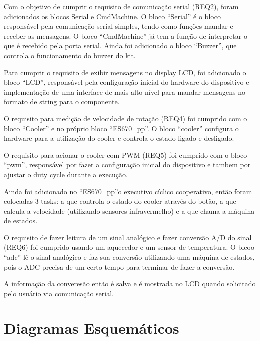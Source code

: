 \documentclass{article}
\begin{document}
Com o objetivo de cumprir o requisito de comunicação serial (REQ2), foram adicionados os blocos Serial e CmdMachine. O bloco ``Serial'' é o bloco responsável pela comunicação serial simples, tendo como funções mandar e receber as mensagens. O bloco ``CmdMachine'' já tem a função de interpretar o que é recebido pela porta serial. Ainda foi adicionado o bloco ``Buzzer'', que controla o funcionamento do buzzer do kit.

Para cumprir o requisito de exibir mensagens no display LCD, foi adicionado o bloco ``LCD'', responsável pela configuração inicial do hardware do dispositivo e implementação de uma interface de mais alto nível para mandar mensagens no formato de string para o componente.

O requisito para medição de velocidade de rotação (REQ4) foi cumprido com o bloco ``Cooler'' e no próprio bloco ``ES670\_pp''. O bloco ``cooler'' configura o hardware para a utilização do cooler e controla o estado ligado e desligado.

O requisito para acionar o cooler com PWM (REQ5) foi cumprido com o bloco ``pwm'', responsável por fazer a configuração inicial do dispositivo e tambem por ajustar o duty cycle durante a execução.

Ainda foi adicionado no ``ES670\_pp''o executivo cíclico cooperativo, então foram colocadas 3 tasks: a que controla o estado do cooler através do botão, a que calcula a velocidade (utilizando sensores infravermelho) e a que chama a máquina de estados.

O requisito de fazer leitura de um sinal analógico e fazer conversão A/D do sinal (REQ6) foi cumprido usando um aquecedor e um sensor de temperatura. O blcoo ``adc'' lê o sinal analógico e faz sua conversão utilizando uma máquina de estados, pois o ADC precisa de um certo tempo para terminar de fazer a conversão.

A informação da converesão então é salva e é mostrada no LCD quando solicitado pelo usuário via comunicação serial.

\section{Diagramas Esquemáticos}
\end{document}
